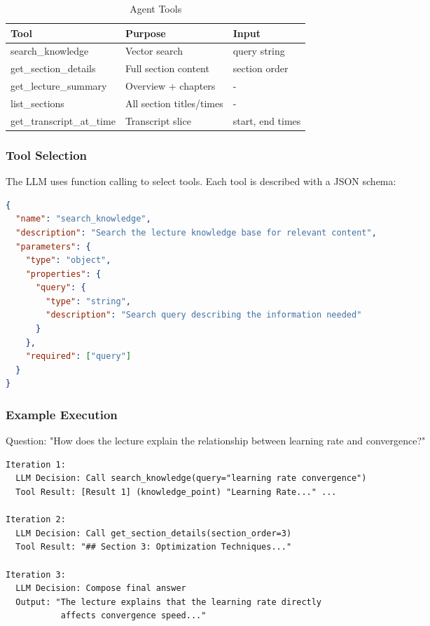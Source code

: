 \documentclass[12pt,a4paper]{article}
\begin{document}
\begin{table}[H]
    \centering
    \caption{Agent Tools}
    \begin{tabular}{@{}lll@{}}
        \toprule
        \textbf{Tool} & \textbf{Purpose} & \textbf{Input} \\ \midrule
        search\_knowledge & Vector search & query string \\
        get\_section\_details & Full section content & section order \\
        get\_lecture\_summary & Overview + chapters & - \\
        list\_sections & All section titles/times & - \\
        get\_transcript\_at\_time & Transcript slice & start, end times \\ \bottomrule
    \end{tabular}
\end{table}

\subsubsection{Tool Selection}

The LLM uses function calling to select tools. Each tool is described with a JSON schema:

\begin{lstlisting}[language=json, caption={Tool Schema Example}]
{
  "name": "search_knowledge",
  "description": "Search the lecture knowledge base for relevant content",
  "parameters": {
    "type": "object",
    "properties": {
      "query": {
        "type": "string",
        "description": "Search query describing the information needed"
      }
    },
    "required": ["query"]
  }
}
\end{lstlisting}

\subsubsection{Example Execution}

Question: "How does the lecture explain the relationship between learning rate and convergence?"

\begin{verbatim}
Iteration 1:
  LLM Decision: Call search_knowledge(query="learning rate convergence")
  Tool Result: [Result 1] (knowledge_point) "Learning Rate..." ...

Iteration 2:
  LLM Decision: Call get_section_details(section_order=3)
  Tool Result: "## Section 3: Optimization Techniques..."

Iteration 3:
  LLM Decision: Compose final answer
  Output: "The lecture explains that the learning rate directly 
           affects convergence speed..."
\end{verbatim}
\end{document}
